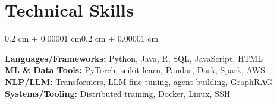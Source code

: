 \documentclass[10pt, letterpaper]{article}
\newenvironment{onecolentry}{
    \begin{adjustwidth}{0.2 cm + 0.00001 cm}{0.2 cm + 0.00001 cm}
}{\end{adjustwidth}}
\begin{document}
    \section{Technical Skills}

    \begin{onecolentry}
        \textbf{Languages/Frameworks:} Python, Java, R, SQL, JavaScript, HTML\\[3pt]
        \textbf{ML \& Data Tools:} PyTorch, scikit-learn, Pandas, Dask, Spark, AWS\\[3pt]
        \textbf{NLP/LLM:} Transformers, LLM fine-tuning, agent building, GraphRAG\\[3pt]
        \textbf{Systems/Tooling:} Distributed training, Docker, Linux, SSH
    \end{onecolentry}
\end{document}
